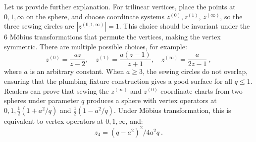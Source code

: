 Let us provide further explanation.
For trilinear vertices, place the points at $0,1, \infty$ on the sphere, and choose coordinate systems $z^{(0)}, z^{(1)}$, $z^{(\infty)}$, 
so the three sewing circles are $|z^{(0,1, \infty)}|=1$. This choice should be invariant under the 6 Möbius transformations that permute the vertices, making the vertex symmetric.
There are multiple possible choices, for example:
\begin{equation}
	z^{(0)}=\frac{a z}{z-2}, \quad z^{(1)}=\frac{a(z-1)}{z+1}, \quad z^{(\infty)}=\frac{a}{2 z-1} \:, \label{9.3.6}
\end{equation}
where $a$ is an arbitrary constant. When $a \geq 3$, the sewing circles do not overlap, ensuring that the plumbing fixture construction gives a good surface for all $q \leq 1$.
Readers can prove that sewing the $z^{(\infty)}$ and $z^{(0)}$ coordinate charts from two spheres under parameter $q$ produces a sphere with vertex operators at $0,1, \frac{1}{2}(1+a^{2}/q)$ and $\frac{1}{2}(1-a^{2}/q)$. 
Under Möbius transformation, this is equivalent to vertex operators at $0,1, \infty$, and:
\begin{equation}
	z_{4}=(q-a^{2})^{2}/4 a^{2} q \:.
	\label{9.3.7}
\end{equation}
